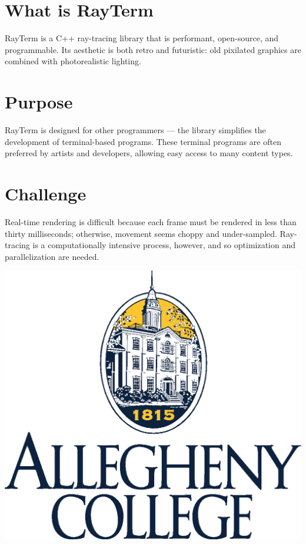 \documentclass[alleghenyposter]{betterposter}
\begin{document}
{\section{What is RayTerm}
RayTerm is a C++ ray-tracing library that is performant, open-source, and programmable.
Its aesthetic is both retro and futuristic: old pixilated graphics are combined with photorealistic lighting.

\section{Purpose}
RayTerm is designed for other programmers --- the library simplifies the development of terminal-based programs.
These terminal programs are often preferred by artists and developers, allowing easy access to many content types.


\section{Challenge}
Real-time rendering is difficult because each frame must be rendered in less than thirty milliseconds; otherwise, movement seems choppy and under-sampled.
Ray-tracing is a computationally intensive process, however, and so optimization and parallelization are needed.

\vfill

\includegraphics[width=\textwidth]{img/allegheny-logo}\\

}
\end{document}
